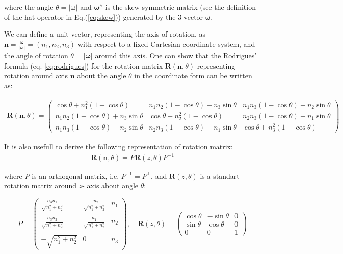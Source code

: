 \documentclass[a4paper,11pt]{report}
\newcommand{\W}{{\bm{\omega}}}
\newcommand{\hatop}[1]{#1^\wedge}
\begin{document}
\noindent where
the angle $\theta = |\W|$ and
$\hatop{\W}$ is the skew symmetric matrix (see the definition of 
the hat operator in Eq.(\ref{eq:skew}))
generated by the 3-vector $\W$. 

We can define a unit vector, representing the axis of rotation, as 
$\mathbf{n} = \frac{\W}{|\W|} = (n_1, n_2, n_3)$ with respect to a
fixed Cartesian coordinate system, and the angle of rotation $\theta =
|\W|$ around this axis. One can show that the Rodrigues' formula (eq.
\ref{eq:rodrigues}) for the rotation matrix $\mathbf{R}(\mathbf{n},
\theta)$ representing rotation around axis $\mathbf{n}$ about the
angle $\theta$ in the coordinate form can be written as:

\begin{eqnarray}
\label{eq:rodrigues_coordinate}
\mathbf{R}(\mathbf{n}, \theta) = 
\begin{pmatrix}
\cos \theta + n_1^2 (1 - \cos \theta) & n_1 n_2 (1 - \cos \theta) -
n_3 \sin \theta & n_1 n_3 (1 - \cos \theta) + n_2 \sin \theta\\
n_1 n_2 (1 - \cos \theta) + n_3 \sin \theta & \cos \theta + n_2^2 (1 -
\cos \theta) & n_2 n_3 (1 - \cos \theta) - n_1 \sin \theta \\
n_1 n_3 (1 - \cos \theta) - n_2 \sin \theta & n_2 n_3 (1 - \cos 
\theta) + n_1 \sin \theta & \cos \theta + n_3^2 (1 - \cos \theta)
\end{pmatrix}
\end{eqnarray}

It is also usefull to derive the following representation of rotation 
matrix:
\begin{eqnarray}
\label{eq:rotation_factorization}
\mathbf{R}(\mathbf{n}, \theta) = P \mathbf{R}(z, \theta) P^{-1}
\end{eqnarray}

\noindent where $P$ is an orthogonal matrix, i.e. $P^{-1} = P^\top$, 
and $\mathbf{R}(z, \theta)$ is a standart rotation matrix around $z$-
axis about angle $\theta$:

\begin{equation}
P = 
\begin{pmatrix}
\frac{n_3 n_1}{\sqrt{n_1^2 + n_2^2}} & \frac{-n_2}{\sqrt{n_1^2 + 
n_2^2}} & n_1\\\\
\frac{n_3 n_2}{\sqrt{n_1^2 + n_2^2}} & \frac{n_1}{\sqrt{n_1^2 + 
n_2^2}} & n_2 \\\\
-\sqrt{n_1^2 + n_2^2} 			 & 0	 & n_3
\end{pmatrix},
\quad
\mathbf{R}(z, \theta) = 
\begin{pmatrix}
\cos \theta & -\sin \theta & 0 \\
\sin \theta & \cos \theta & 0 \\
0 & 0 & 1 
\end{pmatrix}
\end{equation}
\end{document}
